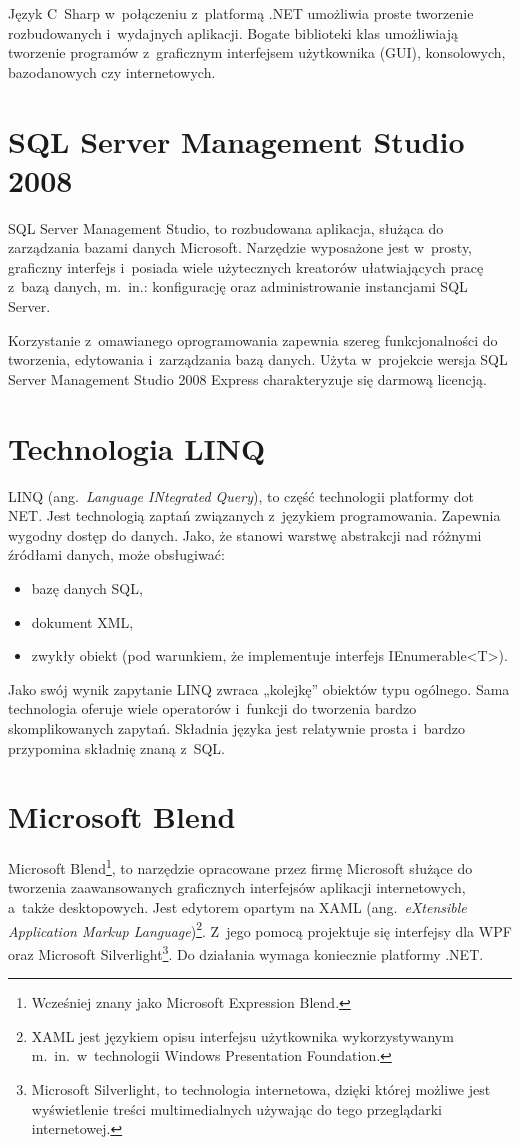 \documentclass[12pt,a4paper]{report}
\begin{document}
Język C~Sharp w~połączeniu z~platformą .NET umożliwia proste tworzenie
rozbudowanych i~wydajnych aplikacji. Bogate biblioteki klas umożliwiają tworzenie programów z~graficznym interfejsem użytkownika (GUI), konsolowych, bazodanowych czy internetowych.

\section{SQL Server Management Studio 2008}
SQL Server Management Studio, to rozbudowana aplikacja, służąca do zarządzania bazami danych Microsoft. Narzędzie wyposażone jest w~prosty, graficzny interfejs i~posiada wiele użytecznych kreatorów ułatwiających pracę z~bazą danych, m.~in.: konfigurację oraz administrowanie instancjami SQL Server.

Korzystanie z~omawianego oprogramowania zapewnia szereg funkcjonalności do tworzenia, edytowania i~zarządzania bazą danych. Użyta w~projekcie wersja SQL Server Management Studio 2008 Express charakteryzuje się darmową licencją. 

\section{Technologia LINQ}
LINQ (ang.~\textit{Language INtegrated Query}), to część technologii platformy  dot NET. Jest technologią zaptań związanych z~językiem programowania. Zapewnia wygodny dostęp do danych. Jako, że stanowi warstwę abstrakcji nad różnymi źródłami danych, może obsługiwać:

\begin{itemize}
  \item bazę danych SQL,
  \item dokument XML,
  \item zwykły obiekt (pod warunkiem, że implementuje interfejs IEnumerable<T>).
\end{itemize}

Jako swój wynik zapytanie LINQ zwraca „kolejkę” obiektów typu ogólnego. Sama technologia oferuje wiele operatorów i~funkcji do tworzenia bardzo skomplikowanych zapytań. Składnia języka jest relatywnie prosta i~bardzo przypomina składnię znaną z~SQL.

\section{Microsoft Blend}
Microsoft Blend\footnote{Wcześniej znany jako Microsoft Expression Blend.}, to narzędzie opracowane przez firmę Microsoft służące do tworzenia zaawansowanych graficznych interfejsów aplikacji internetowych, a~także desktopowych. Jest edytorem opartym na XAML (ang.~\textit{eXtensible Application Markup Language})\footnote{XAML jest językiem opisu interfejsu użytkownika wykorzystywanym m.~in.~w~technologii Windows Presentation Foundation.}. Z~jego pomocą projektuje się interfejsy dla WPF oraz Microsoft Silverlight\footnote{Microsoft Silverlight, to technologia internetowa, dzięki której możliwe jest wyświetlenie treści multimedialnych używając do tego przeglądarki internetowej.}. Do działania wymaga koniecznie platformy .NET.
\end{document}
